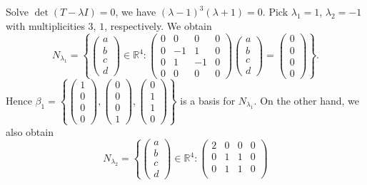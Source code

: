 \begin{Exercise}
\begin{enumerate}[(a)]
\begin{solution}
Solve $\det(T-\lambda I) = 0$, we have $(\lambda-1)^3(\lambda+1) = 0$. Pick $\lambda_1 = 1$, $\lambda_2 = -1$ with multiplicities $3$, $1$, respectively. We obtain
$$
N_{\lambda_1} = \left\{\begin{pmatrix}
a \\
b \\
c \\
d
\end{pmatrix}\in\mathbb{R}^4:\begin{pmatrix}
0 & 0 & 0 & 0 \\
0 & -1 & 1 & 0 \\
0 & 1 & -1 & 0 \\
0 & 0 & 0 & 0
\end{pmatrix} \begin{pmatrix}
a \\
b \\
c \\
d
\end{pmatrix} = \begin{pmatrix}
0 \\
0 \\
0 \\
0
\end{pmatrix} \right\}.
$$
Hence $\beta_1 = \left\{\begin{pmatrix}
1 \\
0 \\
0 \\
0
\end{pmatrix},\begin{pmatrix}
0 \\
0 \\
0 \\
1
\end{pmatrix},\begin{pmatrix}
0 \\
1 \\
1 \\
0
\end{pmatrix}\right\}$ is a basis for $N_{\lambda_1}$. On the other hand, we also obtain
$$
N_{\lambda_2} = \left\{\begin{pmatrix}
a \\
b \\
c \\
d
\end{pmatrix}\in\mathbb{R}^4:\begin{pmatrix}
2 & 0 & 0 & 0 \\
0 & 1 & 1 & 0 \\
0 & 1 & 1 & 0 \\

\end{pmatrix}$$
\end{solution}
\end{enumerate}
\end{Exercise}
